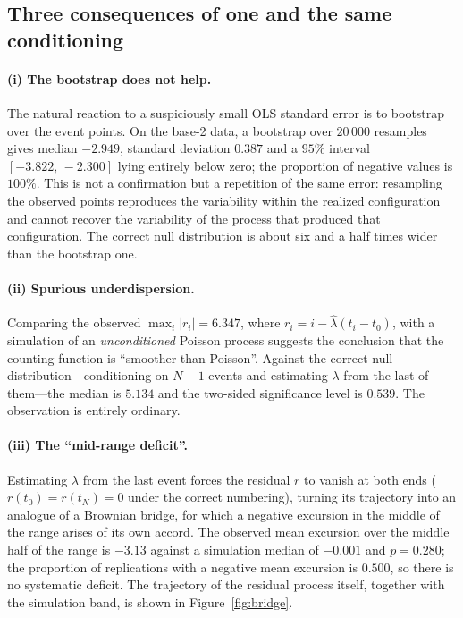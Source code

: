 \documentclass[11pt,a4paper]{article}
\theoremstyle{plain}
\theoremstyle{remark}
\begin{document}
\subsection{Three consequences of one and the same conditioning}

\paragraph{(i) The bootstrap does not help.} The natural reaction to a
suspiciously small OLS standard error is to bootstrap over the event points. On
the base-2 data, a bootstrap over $20\,000$ resamples gives median $-2.949$,
standard deviation $0.387$ and a $95\%$ interval $[-3.822,\,-2.300]$ lying
entirely below zero; the proportion of negative values is $100\%$. This is not a
confirmation but a repetition of the same error: resampling the observed points
reproduces the variability within the realized configuration and cannot recover
the variability of the process that produced that configuration. The correct null
distribution is about six and a half times wider than the bootstrap one.

\paragraph{(ii) Spurious underdispersion.} Comparing the observed
$\max_i|r_i|=6.347$, where $r_i=i-\hat\lambda(t_i-t_0)$, with a simulation of an
\emph{unconditioned} Poisson process suggests the conclusion that the counting
function is ``smoother than Poisson''. Against the correct null
distribution---conditioning on $N-1$ events and estimating $\lambda$ from the
last of them---the median is $5.134$ and the two-sided significance level is
$0.539$. The observation is entirely ordinary.

\paragraph{(iii) The ``mid-range deficit''.} Estimating $\lambda$ from the last
event forces the residual $r$ to vanish at both ends ($r(t_0)=r(t_N)=0$ under
the correct numbering), turning its trajectory into an analogue of a Brownian
bridge, for which a negative excursion in the middle of the range arises of its
own accord. The observed mean excursion over the middle half of the range is
$-3.13$ against a simulation median of $-0.001$ and $p=0.280$; the proportion of
replications with a negative mean excursion is $0.500$, so there is no
systematic deficit. The trajectory of the residual process itself, together with
the simulation band, is shown in Figure~\ref{fig:bridge}.
\end{document}
